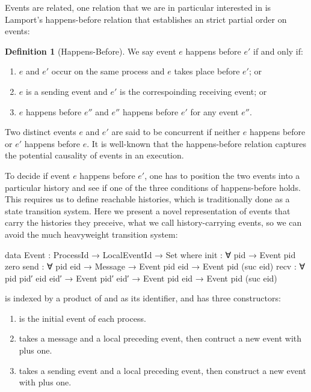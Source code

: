 \documentclass[acmsmall,review,anonymous]{acmart}
\theoremstyle{definition}
\newtheorem{definition}{Definition}
\theoremstyle{theorem}
\begin{document}
Events are related, one relation that we are in particular interested
in is Lamport's happens-before relation that establishes an strict
partial order on events:
\begin{definition}[Happens-Before]
  We say event $e$ happens before $e'$ if and only if:
  \begin{enumerate}
  \item $e$ and $e'$ occur on the same process and $e$ takes place before $e'$; or
  \item $e$ is a sending event and $e'$ is the correspoinding receiving event; or
  \item $e$ happens before $e''$ and $e''$ happens before $e'$ for any event $e''$.
  \end{enumerate}
\end{definition}
\noindent Two distinct events $e$ and $e'$ are said to be concurrent
if neither $e$ happens before or $e'$ happens before $e$.  It is
well-known that the happens-before relation captures the potential
causality of events in an execution.

To decide if event $e$ happens before $e'$, one has to position the
two events into a particular history and see if one of the three
conditions of happens-before holds.  This requires us to define
reachable histories, which is traditionally done as a state transition
system. Here we present a novel representation of events that carry
the histories they preceive, what we call history-carrying events, so
we can avoid the much heavyweight transition system:
\begin{code}
data Event : ProcessId → LocalEventId → Set where
  init  : ∀ {pid} → Event pid zero
  send  : ∀ {pid} {eid} → Message → Event pid eid → Event pid (suc eid)
  recv  : ∀ {pid pid′} {eid eid′} → Event pid′ eid′ → Event pid eid → Event pid (suc eid)
\end{code}
\noindent {} is indexed by a product of
 and  as its
identifier, and has three constructors:
\begin{enumerate}
\item {} is the initial event of each process.
\item {} takes a message and a local preceding event, then
  contruct a new event with  plus one.
\item {} takes a sending event and a local preceding
  event, then construct a new event with  plus
  one.
\end{enumerate}
\end{document}
